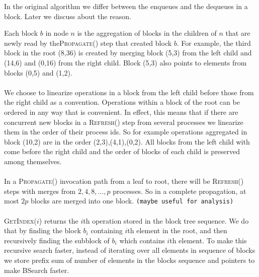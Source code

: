 \documentclass[10pt]{article}
\theoremstyle{definition}
\begin{document}
In the original algorithm  we differ between the enqueues and the dequeues in a block. Later we discuss about the reason.

Each block $b$ in node $n$ is the aggregation of blocks in the  children of $n$ that are newly read by the\textsc{Propagate}() step that created block $b$. For example, the third block in the root (8,36) is created by merging block (5,3) from the left child and (14,6) and (0,16) from the right child. Block (5,3) also points to elements from blocks (0,5) and (1,2). 


\paragraph{}
We choose to linearize operations in a block from the left child before those from the right child as a convention. Operations within a block of the root can be ordered in any way that is convenient. In effect, this means that if there are concurrent new blocks in a \textsc{Refresh}() step from several processes we linearize them in the order of their process ids. So for example  operations aggregated in block (10,2) are in the order (2,3),(4,1),(0,2). All blocks from the left child with come before the right child and the order of blocks of each child is preserved among themselves.


\pagebreak


\paragraph{}
In a \textsc{Propagate}() invocation path from a leaf to root, there will be \textsc{Refresh}() steps with merges from $2, 4, 8, ..., p$ processes. So in a complete propagation, at most $2p$ blocks are merged into one block. \texttt{(maybe useful for analysis)}

\pagebreak

\paragraph{}
\textsc{GetIndex}($i$) returns the $i$th operation stored in the block tree sequence. We do that by finding the block $b_i$ containing $i$th element in the root, and then recursively finding the subblock of $b_i$ which contains $i$th element. To make this recursive search faster, instead of iterating over all elements in sequence of blocks we store prefix sum of number of elements in the blocks sequence and pointers to make BSearch faster.
\end{document}
